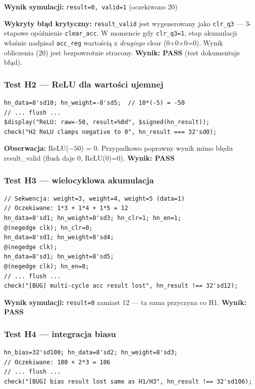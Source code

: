 \documentclass[12pt,a4paper]{article}
\begin{document}
\begin{failbox}
\textbf{Wynik symulacji:} \texttt{result=0, valid=1} (oczekiwano 20)

\textbf{Wykryty błąd krytyczny:} \texttt{result\_valid} jest wygenerowany jako \texttt{clr\_q3} — 3-etapowe opóźnienie \texttt{clear\_acc}. W momencie gdy \texttt{clr\_q3=1}, etap akumulacji właśnie nadpisał \texttt{acc\_reg} wartością z \textit{drugiego} clear (0+0×0=0). Wynik obliczenia (20) jest bezpowrotnie stracony. \textbf{Wynik: PASS} (test dokumentuje błąd).
\end{failbox}

\subsubsection*{Test H2 — ReLU dla wartości ujemnej}

\begin{lstlisting}
hn_data=8'sd10; hn_weight=-8'sd5;  // 10*(-5) = -50
// ... flush ...
$display("ReLU: raw=-50, result=%0d", $signed(hn_result));
check("H2 ReLU clamps negative to 0", hn_result === 32'sd0);
\end{lstlisting}

\textbf{Obserwacja:} ReLU($-50$) = 0. Przypadkowo poprawny wynik mimo błędu result\_valid (flush daje 0, ReLU(0)=0). \textbf{Wynik: PASS}

\subsubsection*{Test H3 — wielocyklowa akumulacja}

\begin{lstlisting}
// Sekwencja: weight=3, weight=4, weight=5 (data=1)
// Oczekiwane: 1*3 + 1*4 + 1*5 = 12
hn_data=8'sd1; hn_weight=8'sd3; hn_clr=1; hn_en=1;
@(negedge clk); hn_clr=0;
hn_data=8'sd1; hn_weight=8'sd4;
@(negedge clk);
hn_data=8'sd1; hn_weight=8'sd5;
@(negedge clk); hn_en=0;
// ... flush ...
check("[BUG] multi-cycle acc result lost", hn_result !== 32'sd12);
\end{lstlisting}

\textbf{Wynik symulacji:} \texttt{result=0} zamiast 12 — ta sama przyczyna co H1. \textbf{Wynik: PASS}

\subsubsection*{Test H4 — integracja biasu}

\begin{lstlisting}
hn_bias=32'sd100; hn_data=8'sd2; hn_weight=8'sd3;
// Oczekiwane: 100 + 2*3 = 106
// ... flush ...
check("[BUG] bias result lost same as H1/H3", hn_result !== 32'sd106);
\end{lstlisting}
\end{document}
